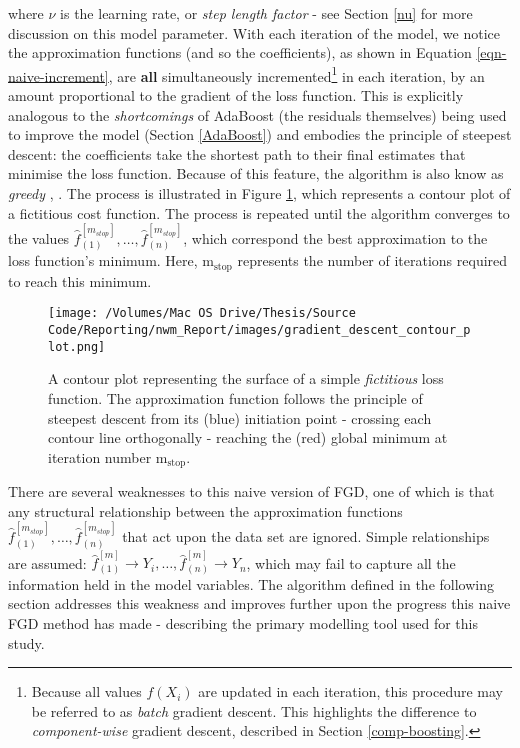 \documentclass{article}
\begin{document}
\vspace{3mm}

where $\nu$ is the learning rate, or \emph{step length factor} - see Section \ref{nu} for more discussion on this model parameter. With each iteration of the model, we notice the approximation functions (and so the coefficients), as shown in Equation \eqref{eqn-naive-increment}, are \textbf{all} simultaneously incremented\footnote{Because all values $f(X_i)$ are updated in each iteration, this procedure may be referred to as \emph{batch} gradient descent. This highlights the difference to \emph{component-wise} gradient descent, described in Section \ref{comp-boosting}.} in each iteration, by an amount proportional to the gradient of the loss function. This is explicitly analogous to the \emph{shortcomings} of AdaBoost (the residuals themselves) being used to improve the model (Section \ref{AdaBoost}) and embodies the principle of steepest descent: the coefficients take the shortest path to their final estimates that minimise the loss function. Because of this feature, the algorithm is also know as \emph{greedy} \cite{friedman2001greedy}, \cite{Hastie2009}. The process is illustrated in Figure \ref{fig:contour_plot}, which represents a contour plot of a fictitious cost function. The process is repeated until the algorithm converges to the values $\hat f_{(1)}^{[m_{stop}]} , … , \hat f_{(n)}^{[m_{stop}]}$, which correspond the best approximation to the loss function's minimum. Here, m$_{\text{stop}}$ represents the number of iterations required to reach this minimum.

\begin{figure}[htb]
\centering
\texttt{[image: /Volumes/Mac OS Drive/Thesis/Source Code/Reporting/nwm\_Report/images/gradient\_descent\_contour\_plot.png]}
\caption[The contour plot of a fictitious loss function]{\label{fig:contour_plot}A contour plot representing the surface of a simple \emph{fictitious} loss function. The approximation function follows the principle of steepest descent from its (blue) initiation point - crossing each contour line orthogonally - reaching the (red) global minimum at iteration number m$_{\text{stop}}$.}
\end{figure}

There are several weaknesses to this naive version of FGD, one of which is that any structural relationship between the approximation functions $\hat f_{(1)}^{[m_{stop}]} , … , \hat f_{(n)}^{[m_{stop}]}$ that act upon the data set are ignored. Simple relationships are assumed: $\hat f_{(1)}^{[m]} \rightarrow Y_i, … , \hat f_{(n)}^{[m]} \rightarrow Y_n$, which may fail to capture all the information held in the model variables. The algorithm defined in the following section addresses this weakness and improves further upon the progress this naive FGD method has made - describing the primary modelling tool used for this study.
\end{document}
